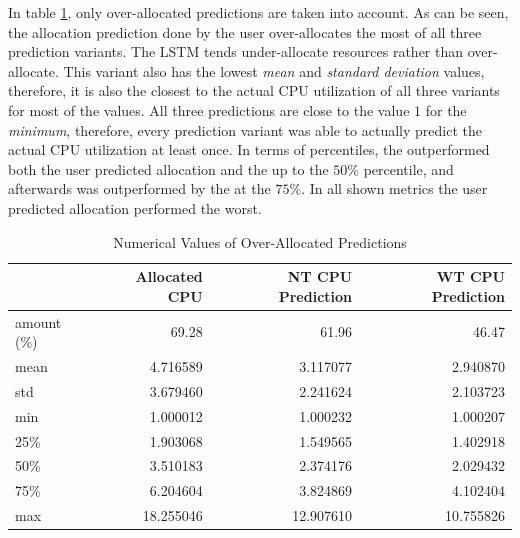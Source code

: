 \documentclass{article}
\begin{document}
    In table \ref{tab:numerical-values-of-cpu-prediction-variants}, only over-allocated predictions are taken into account.
    As can be seen, the allocation prediction done by the user over-allocates the most of all three prediction variants.
    The LSTM  tends under-allocate resources rather than over-allocate. This variant also has the lowest \emph{mean} and \emph{standard deviation} values, therefore, it is also the closest to the actual CPU utilization of all three variants for most of the values.
    All three predictions are close to the value $1$ for the \emph{minimum}, therefore, every prediction variant was able to actually predict the actual CPU utilization at least once.
    In terms of percentiles, the  outperformed both the user predicted allocation and the  up to the $50\%$ percentile, and afterwards was outperformed by the  at the $75\%$.
    In all shown metrics the user predicted allocation performed the worst.
    

    \begin{table}
      \centering
      \begin{tabular}{|l|rrr|}
        \hline
        {} &  \textbf{Allocated CPU} &  \textbf{NT CPU Prediction} &  \textbf{WT CPU Prediction} \\
        \hline
        amount (\%) &        69.28&             61.96 &             46.47 \\
        mean  &       4.716589 &                3.117077 &                2.940870 \\
        std   &       3.679460 &                2.241624 &                2.103723 \\
        min   &       1.000012 &                1.000232 &                1.000207 \\
        25\%   &       1.903068 &                1.549565 &                1.402918 \\
        50\%   &       3.510183 &                2.374176 &                2.029432 \\
        75\%   &       6.204604 &                3.824869 &                4.102404 \\
        max   &      18.255046 &               12.907610 &               10.755826 \\
        \hline
        \end{tabular}
        \caption{Numerical Values of Over-Allocated Predictions}
        \label{tab:numerical-values-of-cpu-prediction-variants}
    \end{table}
  
\end{document}
